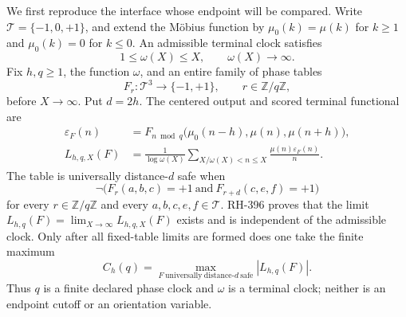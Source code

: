 \documentclass[12pt,a4paper]{article}
\theoremstyle{definition}
\newcommand{\mob}{\mu}
\newcommand{\mobzero}{\mu_0}
\newcommand{\T}{\mathcal T}
\newcommand{\Z}{\mathbb Z}
\begin{document}
We first reproduce the interface whose endpoint will be compared.  Write
\(\T=\{-1,0,+1\}\), and extend the M\"obius function by
\(\mobzero(k)=\mob(k)\) for \(k\geq1\) and \(\mobzero(k)=0\) for \(k\leq0\).
An admissible terminal clock satisfies
\begin{equation}
 1\leq\omega(X)\leq X,
 \qquad \omega(X)\longrightarrow\infty.
 \label{eq:terminal-clock}
\end{equation}
Fix \(h,q\geq1\), the function \(\omega\), and an entire family of phase
tables
\[
 F_r:\T^3\longrightarrow\{-1,+1\},\qquad r\in\Z/q\Z,
\]
before \(X\to\infty\).  Put \(d=2h\).  The centered output and scored
terminal functional are
\begin{align}
 \varepsilon_F(n)
 &=F_{n\bmod q}\bigl(\mobzero(n-h),\mob(n),\mob(n+h)\bigr),
 \label{eq:centered-output}\\
 L_{h,q,X}(F)
 &=\frac1{\log\omega(X)}
 \sum_{X/\omega(X)<n\leq X}\frac{\mob(n)\varepsilon_F(n)}n.
 \label{eq:terminal-functional}
\end{align}
The table is universally distance-\(d\) safe when
\begin{equation}
 \neg\bigl(F_r(a,b,c)=+1\ \text{and}\
 F_{r+d}(c,e,f)=+1\bigr)
 \label{eq:distance-safety}
\end{equation}
for every \(r\in\Z/q\Z\) and every \(a,b,c,e,f\in\T\).  RH-396 proves that
the limit \(L_{h,q}(F)=\lim_{X\to\infty}L_{h,q,X}(F)\) exists and is
independent of the admissible clock.  Only after all fixed-table limits are
formed does one take the finite maximum
\begin{equation}
 C_h(q)=\max_{F\ \mathrm{universally\ distance}\text{-}d\ \mathrm{safe}}
 |L_{h,q}(F)|.
 \label{eq:capacity}
\end{equation}
Thus \(q\) is a finite declared phase clock and \(\omega\) is a terminal
clock; neither is an endpoint cutoff or an orientation variable.
\end{document}
